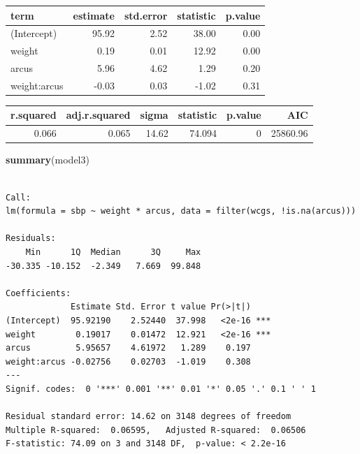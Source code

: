 \documentclass[
]{book}
\newenvironment{Shaded}{\begin{snugshade}}{\end{snugshade}}
\newcommand{\DataTypeTok}[1]{\textcolor[rgb]{0.13,0.29,0.53}{#1}}
\newcommand{\DecValTok}[1]{\textcolor[rgb]{0.00,0.00,0.81}{#1}}
\newcommand{\KeywordTok}[1]{\textcolor[rgb]{0.13,0.29,0.53}{\textbf{#1}}}
\newcommand{\NormalTok}[1]{#1}
\newcommand{\OperatorTok}[1]{\textcolor[rgb]{0.81,0.36,0.00}{\textbf{#1}}}
\newcommand{\StringTok}[1]{\textcolor[rgb]{0.31,0.60,0.02}{#1}}
\begin{document}
\begin{tabular}{l|r|r|r|r}
\hline
term & estimate & std.error & statistic & p.value\\
\hline
(Intercept) & 95.92 & 2.52 & 38.00 & 0.00\\
\hline
weight & 0.19 & 0.01 & 12.92 & 0.00\\
\hline
arcus & 5.96 & 4.62 & 1.29 & 0.20\\
\hline
weight:arcus & -0.03 & 0.03 & -1.02 & 0.31\\
\hline
\end{tabular}

\begin{Shaded}
\end{Shaded}

\begin{tabular}{r|r|r|r|r|r}
\hline
r.squared & adj.r.squared & sigma & statistic & p.value & AIC\\
\hline
0.066 & 0.065 & 14.62 & 74.094 & 0 & 25860.96\\
\hline
\end{tabular}

\begin{Shaded}
\begin{Highlighting}[]
\KeywordTok{summary}\NormalTok{(model3)}
\end{Highlighting}
\end{Shaded}

\begin{verbatim}

Call:
lm(formula = sbp ~ weight * arcus, data = filter(wcgs, !is.na(arcus)))

Residuals:
    Min      1Q  Median      3Q     Max 
-30.335 -10.152  -2.349   7.669  99.848 

Coefficients:
             Estimate Std. Error t value Pr(>|t|)    
(Intercept)  95.92190    2.52440  37.998   <2e-16 ***
weight        0.19017    0.01472  12.921   <2e-16 ***
arcus         5.95657    4.61972   1.289    0.197    
weight:arcus -0.02756    0.02703  -1.019    0.308    
---
Signif. codes:  0 '***' 0.001 '**' 0.01 '*' 0.05 '.' 0.1 ' ' 1

Residual standard error: 14.62 on 3148 degrees of freedom
Multiple R-squared:  0.06595,	Adjusted R-squared:  0.06506 
F-statistic: 74.09 on 3 and 3148 DF,  p-value: < 2.2e-16
\end{verbatim}
\end{document}
